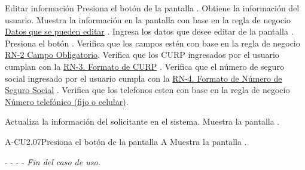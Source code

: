 	\begin{UCtrayectoria}{Editar información }
        \UCpaso[\UCactor]Presiona el botón  de la pantalla .
        \UCpaso[\UCsist] Obtiene la información del usuario.
		\UCpaso[\UCsist] Muestra la información en la pantalla   con base en la regla de negocio \hyperlink{RN11}{Datos que se pueden editar} . 
		\UCpaso[\UCactor] Ingresa los datos que desee editar de la pantalla .
		\UCpaso[\UCactor] Presiona el botón . 
		\UCpaso[\UCsist] Verifica que los campos estén con base en la regla de negocio \hyperlink{RN2}{RN-2 Campo Obligatorio}. 
		\UCpaso[\UCsist] Verifica que los CURP ingresados por el usuario cumplan con la \hyperlink{RN3}{RN-3. Formato de CURP} . 
		\UCpaso[\UCsist] Verifica que el número de seguro social ingresado por el usuario cumpla con la \hyperlink{RN4}{RN-4. Formato de Número de Seguro Social} . 
			\UCpaso[\UCsist] Verifica que los telefonos esten con base en la regla de negocio \hyperlink{RN10}{Número telefónico (fijo o celular)}. 
	
        \UCpaso[\UCsist] Actualiza la información del solicitante en el sistema.
	    \UCpaso[\UCsist] Muestra la pantalla .
	
	\end{UCtrayectoria}
	

	

	
	

	\begin{UCtrayectoriaA}{A-CU2.07}{Presiona el botón  de la pantalla }{A}
		\UCpaso[\UCsist] Muestra la pantalla .
		\item[- -] - - {\em Fin del caso de uso.} 
	\end{UCtrayectoriaA}


